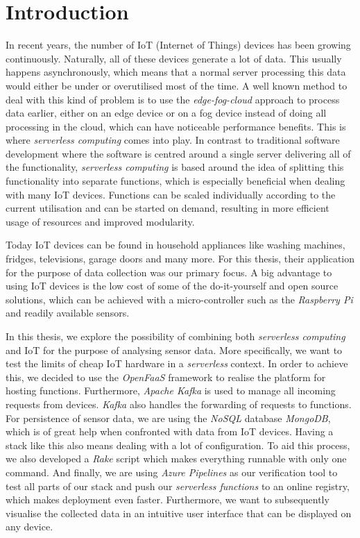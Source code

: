 \chapter{Introduction}
\label{sec:introduction}

In recent years, the number of IoT (Internet of Things) devices has been growing continuously.
Naturally, all of these devices generate a lot of data. This usually happens asynchronously, which
means that a normal server processing this data would either be under or overutilised most of the time. A well known
method to deal with this kind of problem is to use the \textit{edge-fog-cloud} approach to process
data earlier, either on an edge device or on a fog device instead of doing all processing in
the cloud, which can have noticeable performance benefits. This is where \textit{serverless
computing} comes into play. In contrast to traditional software development where the software is
centred around a single server delivering all of the functionality, \textit{serverless computing} is
based around the idea of splitting this functionality into separate functions, which is especially
beneficial when dealing with many IoT devices. Functions can be scaled individually according
to the current utilisation and can be started on demand, resulting in more efficient usage of
resources and improved modularity.

Today IoT devices can be found in household appliances like washing machines, fridges, televisions,
garage doors and many more. For this thesis, their application for the purpose of data collection
was our primary focus. A big advantage to using IoT devices is the low cost of some of the
do-it-yourself and open source solutions, which can be achieved with a
micro-controller such as the \textit{Raspberry Pi} and readily available
 sensors.

In this thesis, we explore the possibility of combining both \textit{serverless computing} and IoT
for the purpose of analysing sensor data. More specifically, we want to test the limits of cheap IoT
hardware in a \textit{serverless} context. In order to achieve this, we decided to use the
\textit{OpenFaaS} framework to realise the platform for hosting functions. Furthermore,
\textit{Apache Kafka} is used to manage all incoming requests from devices. \textit{Kafka} also
handles the forwarding of requests to functions. For persistence of sensor data, we are using the
\textit{NoSQL} database \textit{MongoDB}, which is of great help when confronted with data from
IoT devices. Having a stack like this also means dealing with a lot of configuration. To
aid this process, we also developed a \textit{Rake} script which makes everything runnable with only
one command. And finally, we are using \textit{Azure Pipelines} as our verification tool to test all
parts of our stack and push our \textit{serverless functions} to an online registry, which makes
deployment even faster. Furthermore, we want to subsequently visualise the collected data in an
intuitive user interface that can be displayed on any device.

